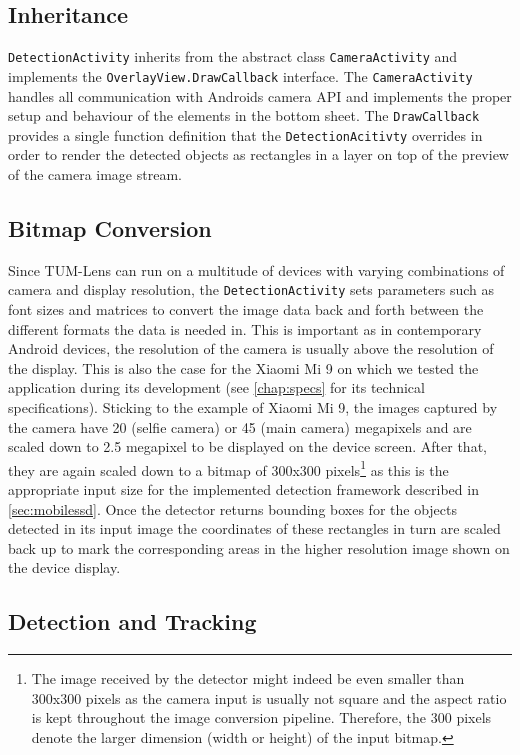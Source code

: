 \documentclass[
			   fontsize=11pt,
               paper=a4,
               bibliography=totoc,
               idxtotoc,
               headsepline,
               footsepline,
               footinclude=false,
               BCOR=12mm,
               DIV=13,
               openany,   %
               ]
               {scrbook}
\newcommand{\code}[1]{\lstinline[basicstyle = \ttfamily\small]{#1}} %
\begin{document}
\subsection{Inheritance}

\code{DetectionActivity} inherits from the abstract class \code{CameraActivity} and implements the \code{OverlayView.DrawCallback} interface. The \code{CameraActivity} handles all communication with Androids camera API and implements the proper setup and behaviour of the elements in the bottom sheet. The \code{DrawCallback} provides a single function definition that the \code{DetectionAcitivty} overrides in order to render the detected objects as rectangles in a layer on top of the preview of the camera image stream.

\subsection{Bitmap Conversion}

Since TUM-Lens can run on a multitude of devices with varying combinations of camera and display resolution, the \code{DetectionActivity} sets parameters such as font sizes and matrices to convert the image data back and forth between the different formats the data is needed in. This is important as in contemporary Android devices, the resolution of the camera is usually above the resolution of the display. This is also the case for the Xiaomi Mi 9 on which we tested the application during its development (see \autoref{chap:specs} for its technical specifications). Sticking to the example of Xiaomi Mi 9, the images captured by the camera have 20 (selfie camera) or 45 (main camera) megapixels and are scaled down to 2.5 megapixel to be displayed on the device screen. After that, they are again scaled down to a bitmap of 300x300 pixels\footnote{The image received by the detector might indeed be even smaller than 300x300 pixels as the camera input is usually not square and the aspect ratio is kept throughout the image conversion pipeline. Therefore, the 300 pixels denote the larger dimension (width or height) of the input bitmap.} as this is the appropriate input size for the implemented detection framework described in \autoref{sec:mobilessd}. Once the detector returns bounding boxes for the objects detected in its input image the coordinates of these rectangles in turn are scaled back up to mark the corresponding areas in the higher resolution image shown on the device display.

\subsection{Detection and Tracking} \label{ssec:detectionAndTracking}
\end{document}
